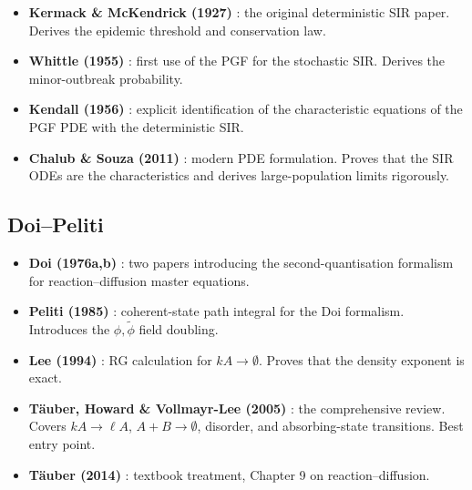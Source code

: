 \documentclass[11pt,a4paper]{article}
\theoremstyle{definition}
\begin{document}
\begin{itemize}[leftmargin=2em]
  \item \textbf{Kermack \& McKendrick (1927)} \cite{kermack1927}: the original
        deterministic SIR paper. Derives the epidemic threshold and conservation law.

  \item \textbf{Whittle (1955)} \cite{whittle1955}: first use of the PGF for
        the stochastic SIR. Derives the minor-outbreak probability.

  \item \textbf{Kendall (1956)} \cite{kendall1956}: explicit identification of the
        characteristic equations of the PGF PDE with the deterministic SIR.

  \item \textbf{Chalub \& Souza (2011)} \cite{chalub2011}: modern PDE formulation.
        Proves that the SIR ODEs are the characteristics and derives large-population
        limits rigorously.
\end{itemize}

\subsection{Doi--Peliti}

\begin{itemize}[leftmargin=2em]
  \item \textbf{Doi (1976a,b)} \cite{doi1976a,doi1976b}: two papers introducing the
        second-quantisation formalism for reaction--diffusion master equations.

  \item \textbf{Peliti (1985)} \cite{peliti1985}: coherent-state path integral
        for the Doi formalism. Introduces the $\phi, \tilde\phi$ field doubling.

  \item \textbf{Lee (1994)} \cite{lee1994}: RG calculation for $kA\to\emptyset$.
        Proves that the density exponent is exact.

  \item \textbf{T\"auber, Howard \& Vollmayr-Lee (2005)} \cite{tauber2005}: the
        comprehensive review. Covers $kA\to\ell A$, $A+B\to\emptyset$, disorder,
        and absorbing-state transitions. Best entry point.

  \item \textbf{T\"auber (2014)} \cite{tauber2014}: textbook treatment, Chapter 9
        on reaction--diffusion.
\end{itemize}
\end{document}
